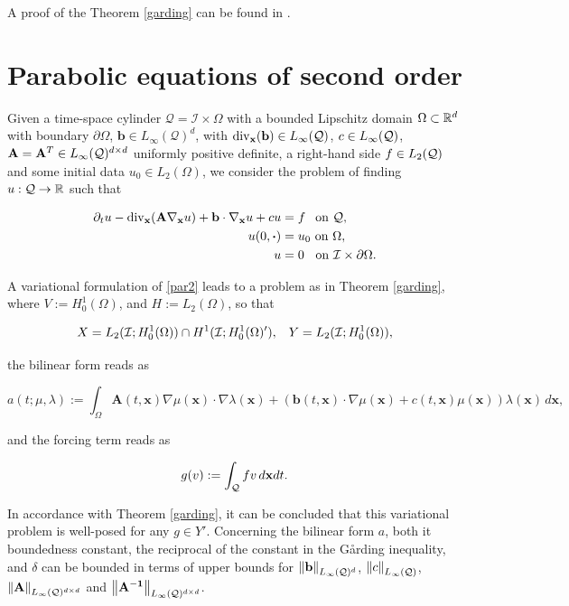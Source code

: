A proof of the Theorem \ref{garding} can be found in \cite[Theorem 5.1]{schwab2009space}. 

\section{Parabolic equations of second order}\label{2order}

Given a time-space cylinder $\mathcal{Q}=\mathcal{I}\times\Omega$ with a bounded Lipschitz domain $\Omega\subset\mathbb{R}^d$ with boundary $\partial\Omega$, $\mathbf{b}\in L_{\infty}(\mathcal{Q})^d$, with $\operatorname{div}_{\mathbf{x}}(\mathbf{b})\in L_\infty(\mathcal{Q})$, $c\in L_{\infty}(\mathcal{Q})$, $\mathbf{A}=\mathbf{A}^T\in L_{\infty}(\mathcal{Q})^{d\times d}$ uniformly positive definite, a right-hand side $f\in L_2(\mathcal{Q})$ and some initial data $u_0\in L_2(\Omega)$, we consider the problem of finding $u:\mathcal{Q}\to\mathbb{R}$ such that

\begin{subequations}\label{par2}
    \begin{align}
        \partial_tu-\operatorname{div}_{\mathbf{x}}(\mathbf{A}\nabla_{\mathbf{x}}u)+\mathbf{b}\cdot\nabla_{\mathbf{x}}u+cu&=f\hspace{0.16 cm}\text{ on }\mathcal{Q},\\u(0,\boldsymbol{\cdot})&=u_0\text{ on }\Omega,\\u&=0\hspace{0.2 cm}\text{ on }\mathcal{I}\times\partial\Omega.
    \end{align}
\end{subequations}

A variational formulation of \eqref{par2} leads to a problem as in Theorem \ref{garding}, where $V:=H_0^1(\Omega)$, and $H:=L_2(\Omega)$, so that

$$X=L_2(\mathcal{I};H_0^1(\Omega))\cap H^1(\mathcal{I};H_0^1(\Omega)'),\hspace{0.3 cm} Y=L_2(\mathcal{I};H_0^1(\Omega)),$$

the bilinear form reads as

$$a(t;\mu,\lambda):=\int_\Omega \mathbf{A}(t,\mathbf{x})\nabla\mu(\mathbf{x})\cdot\nabla\lambda(\mathbf{x})+(\mathbf{b}(t,\mathbf{x})\cdot\nabla\mu(\mathbf{x})+c(t,\mathbf{x})\mu(\mathbf{x}))\lambda(\mathbf{x})\,d\mathbf{x},$$

and the forcing term reads as

$$g(v):=\int_{\mathcal{Q}} fv\,d\mathbf{x}dt.$$

In accordance with Theorem \ref{garding}, it can be concluded that this variational problem is well-posed for any $g\in Y'$. Concerning the bilinear form $a$, both it boundedness constant, the reciprocal of the constant in the Gårding inequality, and $\delta$ can be bounded in terms of upper bounds for $\left\lVert\mathbf{b} \right\rVert_{L_\infty(\mathcal{Q})^d}$, $\left\lVert c \right\rVert_{L_\infty(\mathcal{Q})}$, $\left\lVert\mathbf{A} \right\rVert_{L_\infty(\mathcal{Q})^{d\times d}}$ and $\left\lVert\mathbf{A^{-1}} \right\rVert_{L_\infty(\mathcal{Q})^{d\times d}}$.

